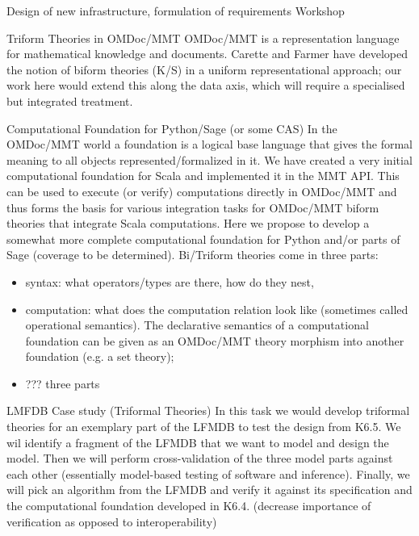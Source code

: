 \begin{Workpackage}{\thewpno}
\begin{task}{Design of new infrastructure, formulation of requirements}
Workshop
\end{task}

\begin{task}{Triform Theories in OMDoc/MMT}
\label{task:data_triform}
OMDoc/MMT is a representation language for mathematical knowledge and documents. Carette and Farmer have developed the notion of biform theories (K/S) in a uniform representational approach; our work here would extend this along the data axis, which will require a specialised but integrated treatment.
\end{task}

\begin{task}{Computational Foundation for Python/Sage (or some CAS)}
\label{task:data_foundationCAS}
In the OMDoc/MMT world a foundation is a logical base language that gives the formal meaning to all objects represented/formalized in it. We have created a very initial computational foundation for Scala and implemented it in the MMT API. This can be used to execute (or verify) computations directly in OMDoc/MMT and thus forms the basis for various integration tasks for OMDoc/MMT biform theories that integrate Scala computations. Here we propose to develop a somewhat more complete computational foundation for Python and/or parts of Sage (coverage to be determined). Bi/Triform theories come in three parts:
\begin{itemize}
\item syntax: what operators/types are there, how do they nest, 
\item computation:  what does the computation relation look like (sometimes called operational semantics). The declarative semantics of a computational foundation can be given as an OMDoc/MMT theory morphism into another foundation (e.g. a set theory);
\item ??? three parts
\end{itemize}
\end{task}


\begin{task}{LMFDB Case study (Triformal Theories)}
\label{task:data_LMFDB}
In this task we would develop triformal theories for an exemplary part of the LFMDB to test the design from K6.5.  We wil identify a fragment of the LFMDB that we want to model and design the model. Then we will perform cross-validation of the three model parts against each other (essentially model-based testing of software and inference). Finally, we will pick an algorithm from the LFMDB and verify it against its specification and the computational foundation developed in K6.4. (decrease importance of verification as opposed to interoperability)


\end{task}
\end{Workpackage}
